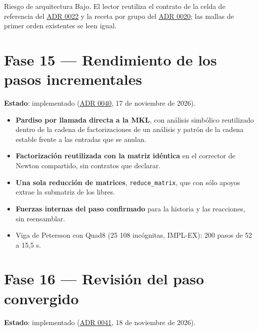 \documentclass[11pt,oneside]{report}
\begin{document}
\begin{infobox}{Riesgo de arquitectura}
Bajo. El lector reutiliza el contrato de la celda de referencia del \hyperref[adr:0022]{ADR 0022} y la receta por grupo del \hyperref[adr:0020]{ADR 0020}; las mallas de primer orden existentes se leen igual.
\end{infobox}

\section{Fase 15 --- Rendimiento de los pasos incrementales}

\textbf{Estado}: implementado (\hyperref[adr:0040]{ADR 0040}, 17 de noviembre de 2026).

\begin{itemize}
  \item \textbf{Pardiso por llamada directa a la MKL}, con análisis simbólico reutilizado dentro de la cadena de factorizaciones de un análisis y patrón de la cadena estable frente a las entradas que se anulan.
  \item \textbf{Factorización reutilizada con la matriz idéntica} en el corrector de Newton compartido, sin contratos que declarar.
  \item \textbf{Una sola reducción de matrices}, \texttt{reduce\_matrix}, que con sólo apoyos extrae la submatriz de los libres.
  \item \textbf{Fuerzas internas del paso confirmado} para la historia y las reacciones, sin reensamblar.
  \item Viga de Petersson con Quad8 (25 108 incógnitas, IMPL-EX): 200 pasos de 52 a 15,5 s.
\end{itemize}

\section{Fase 16 --- Revisión del paso convergido}

\textbf{Estado}: implementado (\hyperref[adr:0041]{ADR 0041}, 18 de noviembre de 2026).
\end{document}
